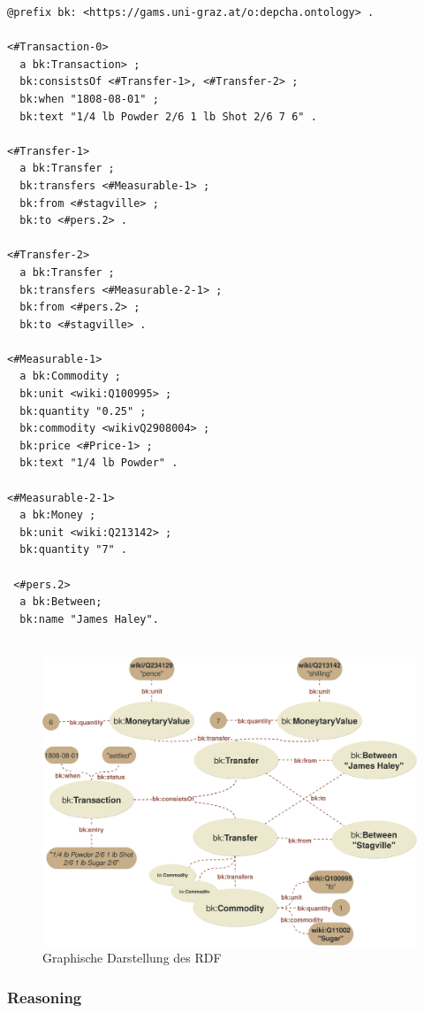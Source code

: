 \documentclass[12pt,a4paper]{article}
\begin{document}
\begin{lstlisting}[]
@prefix bk: <https://gams.uni-graz.at/o:depcha.ontology> .

<#Transaction-0>
  a bk:Transaction> ;
  bk:consistsOf <#Transfer-1>, <#Transfer-2> ;
  bk:when "1808-08-01" ;
  bk:text "1/4 lb Powder 2/6 1 lb Shot 2/6 7 6" .

<#Transfer-1>
  a bk:Transfer ;
  bk:transfers <#Measurable-1> ;
  bk:from <#stagville> ;
  bk:to <#pers.2> .

<#Transfer-2>
  a bk:Transfer ;
  bk:transfers <#Measurable-2-1> ;
  bk:from <#pers.2> ;
  bk:to <#stagville> .

<#Measurable-1>
  a bk:Commodity ;
  bk:unit <wiki:Q100995> ;
  bk:quantity "0.25" ;
  bk:commodity <wikivQ2908004> ;
  bk:price <#Price-1> ;
  bk:text "1/4 lb Powder" .

<#Measurable-2-1>
  a bk:Money ;
  bk:unit <wiki:Q213142> ;
  bk:quantity "7" .
  
 <#pers.2>
  a bk:Between;
  bk:name "James Haley".
  
\end{lstlisting}

\begin{figure}[H]
\centering
	\includegraphics[width=1\textwidth]{img/example.png}  
    \caption[Graphische Darstellung des RDF, eigene Darstellung, 01.06.2019.]{Graphische Darstellung des RDF} \label{fig:example}
\end{figure}

\subsubsection{Reasoning}
\end{document}
